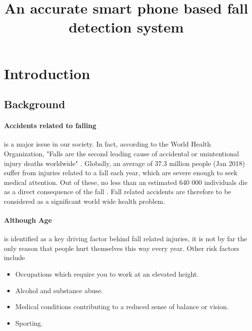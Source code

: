 \documentclass[12pt, a4paper, onecolumn]{article}
\begin{document}
	
	\title{An accurate smart phone based fall detection system}
	\maketitle

	\tableofcontents
	\newpage
	
	\section{Introduction}
	
		\subsection{Background}
		
		\paragraph{Accidents related to falling} is a major issue in our society. In fact, according to the World Health Organization, "Falls are the second leading cause of accidental or unintentional injury deaths worldwide" \cite{who}. Globally, an average of 37.3 million people (Jan 2018) suffer from injuries related to a fall each year, which are severe enough to seek medical attention. Out of these, no less than an estimated 640 000 individuals die as a direct consequence of the fall \cite{who}. Fall  related accidents are therefore to be considered as a significant world wide health problem. 
		
		\paragraph{Although Age} is identified as a key driving factor behind fall related injuries, it is not by far the only reason that people hurt themselves this way every year.  Other risk factors include 
		\begin{itemize}
			\item Occupations which require you to work at an elevated height.
			\item Alcohol and substance abuse.
			\item Medical conditions contributing to a reduced sense of balance or vision.
			\item Sporting.	
		\end{itemize}
		
\end{document}
